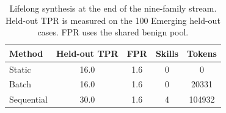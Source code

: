\begin{table}[t]
  \centering
  \small
  \setlength{\tabcolsep}{4pt}
  \caption{
    Lifelong synthesis at the end of the nine-family stream.
    Held-out TPR is measured on the 100 Emerging held-out cases.
    FPR uses the shared benign pool.
  }
  \label{tab:lifelong-synthesis}
  \begin{tabular*}{\columnwidth}{@{\extracolsep{\fill}}lcccc@{}}
    \toprule
    Method & Held-out TPR & FPR & Skills & Tokens \\
    \midrule
    Static
      & 16.0 & 1.6 & 0 & 0 \\
    Batch
      & 16.0 & 1.6 & 0 & 20331 \\
    Sequential
      & 30.0 & 1.6 & 4 & 104932 \\
    \bottomrule
  \end{tabular*}

\end{table}
